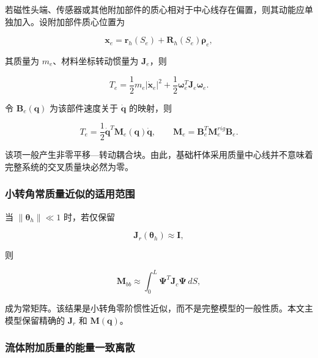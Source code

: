 若磁性头端、传感器或其他附加部件的质心相对于中心线存在偏置，则其动能应单独加入。设附加部件质心位置为

\begin{equation}
\label{eq:galerkin-2-48}
\mathbf{x}_{e} = \mathbf{r}_{h}\left( S_{e} \right) + \mathbf{R}_{h}\left( S_{e} \right)\bm{\rho}_{e},
\end{equation}

其质量为 \(m_{e}\)、材料坐标转动惯量为 \(\mathbf{J}_{e}\)，则

\begin{equation}
\label{eq:galerkin-2-49}
T_{e} = \frac{1}{2}m_{e}\left| {\dot{\mathbf{x}}}_{e} \right|^{2} + \frac{1}{2}\bm{\omega}_{e}^{T}\mathbf{J}_{e}\bm{\omega}_{e}.
\end{equation}

令 \(\mathbf{B}_{e}\left( \mathbf{q} \right)\) 为该部件速度关于 \(\dot{\mathbf{q}}\) 的映射，则

\begin{equation}
\label{eq:galerkin-2-50}
T_{e} = \frac{1}{2}{\dot{\mathbf{q}}}^{T}\mathbf{M}_{e}\left( \mathbf{q} \right)\dot{\mathbf{q}},\quad\quad\mathbf{M}_{e} = \mathbf{B}_{e}^{T}\mathbf{M}_{e}^{rig}\mathbf{B}_{e}.
\end{equation}

该项一般产生非零平移---转动耦合块。由此，基础杆体采用质量中心线并不意味着完整系统的交叉质量块必然为零。

\subsubsection{小转角常质量近似的适用范围}\label{sec:galerkin-2-4-5}

当 \(\parallel \bm{\theta}_{h} \parallel \ll 1\) 时，若仅保留

\begin{equation}
\label{eq:galerkin-2-51}
\mathbf{J}_{r}\left( \bm{\theta}_{h} \right) \approx \mathbf{I},
\end{equation}

则

\begin{equation}
\label{eq:galerkin-2-52}
\mathbf{M}_{bb} \approx \int_{0}^{L}\bm{\Psi}^{T}\mathbf{J}_{c}\bm{\Psi}\, dS,
\end{equation}

成为常矩阵。该结果是小转角零阶惯性近似，而不是完整模型的一般性质。本文主模型保留精确的 \(\mathbf{J}_{r}\) 和 \(\mathbf{M}\left( \mathbf{q} \right)\)。

\subsubsection{流体附加质量的能量一致离散}\label{sec:galerkin-2-4-6}


